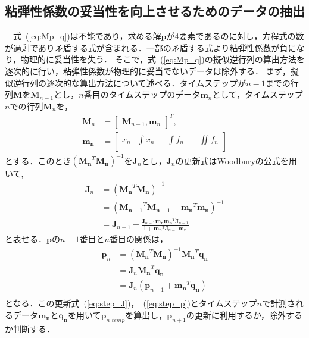 \documentclass[a4paper]{jarticle}
\begin{document}
\subsection{粘弾性係数の妥当性を向上させるためのデータの抽出}\label{subsec:downsample}
　式~(\ref{eq:Mp_q})は不能であり，求める解$\mathbf{p}$が4要素であるのに対し，方程式の数が過剰であり矛盾する式が含まれる．一部の矛盾する式より粘弾性係数が負になり，物理的に妥当性を失う．
そこで，式~(\ref{eq:Mp_q})の擬似逆行列の算出方法を逐次的に行い，粘弾性係数が物理的に妥当でないデータは除外する．
まず，擬似逆行列の逐次的な算出方法について述べる．タイムステップが$n-1$までの行列$\mathbf{M}$を$\mathbf{M}_{n-1}$とし，$n$番目のタイムステップのデータ$\mathbf{m}_n$として，タイムステップ$n$での行列$\mathbf{M}_n$を，
\begin{equation}
    \begin{aligned}
        \mathbf{M}_n &= \begin{bmatrix}
            \mathbf{M}_{n-1} ,\mathbf{m}_n
        \end{bmatrix}^{T},\\
        \mathbf{m_{n}}&=\begin{bmatrix}
            x_{n} & \int{x_{n}} & -\int{f_{n}}\ & -\iint{f_{n}}\\
        \end{bmatrix}
    \end{aligned}
\end{equation}
とする．このとき$(\mathbf{M_{n}}^{T}\mathbf{M_{n}})^{-1}$を$\mathbf{J}_{n}$とし，$\mathbf{J}_{n}$の更新式はWoodburyの公式を用いて,
\begin{equation}
    \begin{aligned}
    \mathbf{J}_n &= (\mathbf{M_{n}}^{T}\mathbf{M_{n}})^{-1}\\
                 &= (\mathbf{M_{n-1}}^{T}\mathbf{M_{n-1}} + \mathbf{m_{n}}^{T}\mathbf{m_{n}})^{-1}\\
                 &= \mathbf{J}_{n-1} - \frac{\mathbf{J}_{n-1}\mathbf{m_{n}}\mathbf{m_{n}}^{T}\mathbf{J}_{n-1}}{1+\mathbf{m_{n}}^{T}\mathbf{J}_{n-1}\mathbf{m_{n}}}
    \end{aligned}
    \label{eq:step_J}
\end{equation}
と表せる．$\mathbf{p}$の$n-1$番目と$n$番目の関係は，
\begin{equation}
    \begin{aligned}
    \mathbf{p}_n &= (\mathbf{M_{n}}^{T}\mathbf{M_{n}})^{-1}\mathbf{M_{n}}^{T}\mathbf{q_{n}}\\
                 &= \mathbf{J}_{n}\mathbf{M_{n}}^{T}\mathbf{q_{n}}\\
                 &= \mathbf{J}_{n}(\mathbf{p}_{n-1}+\mathbf{m_{n}}^{T}\mathbf{q_{n}})\\
    \end{aligned}
    \label{eq:step_p}
\end{equation}
となる．この更新式~(\ref{eq:step_J})，~(\ref{eq:step_p})とタイムステップ$n$で計測されるデータ$\mathbf{m_{n}}$と$\mathbf{q_{n}}$を用いて$\mathbf{p}_{n\_temp}$を算出し，$\mathbf{p}_{n+1}$の更新に利用するか，除外するか判断する．
\end{document}
